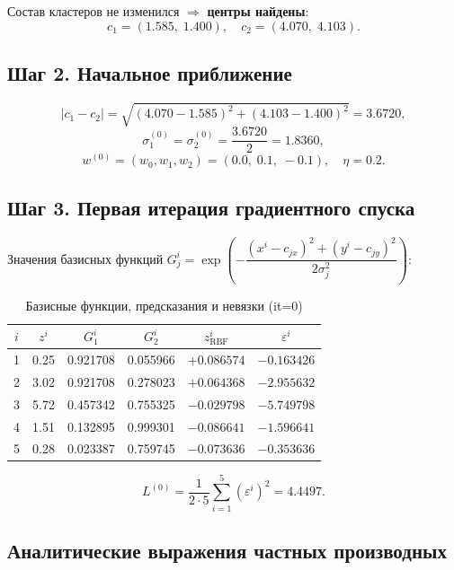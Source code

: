 \documentclass[12pt,a4paper]{article}
\begin{document}
Состав кластеров не изменился $\Rightarrow$ \textbf{центры найдены}:
\[
  \boxed{c_1 = (1.585,\;1.400), \quad c_2 = (4.070,\;4.103).}
\]

\subsection{Шаг 2. Начальное приближение}

\[
  |c_1 - c_2| = \sqrt{(4.070-1.585)^2 + (4.103-1.400)^2} = 3.6720,
\]
\[
  \sigma_1^{(0)} = \sigma_2^{(0)} = \frac{3.6720}{2} = 1.8360,
\]
\[
  w^{(0)} = (w_0, w_1, w_2) = (0.0,\;0.1,\;-0.1), \quad \eta = 0.2.
\]

\subsection{Шаг 3. Первая итерация градиентного спуска}

Значения базисных функций $G_j^i = \exp\!\left(-\dfrac{(x^i-c_{jx})^2+(y^i-c_{jy})^2}{2\sigma_j^2}\right)$:

\begin{table}[H]
\centering
\caption{Базисные функции, предсказания и невязки (it=0)}
\begin{tabular}{cccccc}
\toprule
$i$ & $z^i$ & $G_1^i$ & $G_2^i$ & $z_{\mathrm{RBF}}^i$ & $\varepsilon^i$ \\
\midrule
1 & 0.25 & 0.921708 & 0.055966 & $+0.086574$ & $-0.163426$ \\
2 & 3.02 & 0.921708 & 0.278023 & $+0.064368$ & $-2.955632$ \\
3 & 5.72 & 0.457342 & 0.755325 & $-0.029798$ & $-5.749798$ \\
4 & 1.51 & 0.132895 & 0.999301 & $-0.086641$ & $-1.596641$ \\
5 & 0.28 & 0.023387 & 0.759745 & $-0.073636$ & $-0.353636$ \\
\bottomrule
\end{tabular}
\end{table}

\[
  L^{(0)} = \frac{1}{2\cdot 5}\sum_{i=1}^5 (\varepsilon^i)^2 = 4.4497.
\]

\subsection{Аналитические выражения частных производных}
\end{document}
